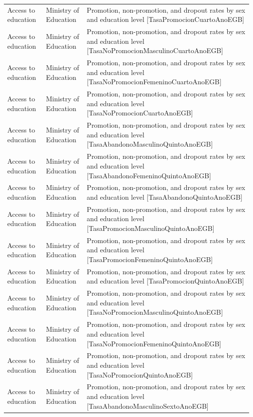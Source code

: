 \documentclass[10pt,a4paper]{article}
\begin{document}
\begin{longtable}{@{}>{\raggedright\arraybackslash}p{3.5cm}>{\raggedright\arraybackslash}p{5.6cm}>{\raggedright\arraybackslash}p{\dimexpr\textwidth-9.1cm-4\tabcolsep\relax}@{}}
Access to education & Ministry of Education & Promotion, non-promotion, and dropout rates by sex and education level [TasaPromocionCuartoAnoEGB]\\
Access to education & Ministry of Education & Promotion, non-promotion, and dropout rates by sex and education level [TasaNoPromocionMasculinoCuartoAnoEGB]\\
Access to education & Ministry of Education & Promotion, non-promotion, and dropout rates by sex and education level [TasaNoPromocionFemeninoCuartoAnoEGB]\\
Access to education & Ministry of Education & Promotion, non-promotion, and dropout rates by sex and education level [TasaNoPromocionCuartoAnoEGB]\\
Access to education & Ministry of Education & Promotion, non-promotion, and dropout rates by sex and education level [TasaAbandonoMasculinoQuintoAnoEGB]\\
Access to education & Ministry of Education & Promotion, non-promotion, and dropout rates by sex and education level [TasaAbandonoFemeninoQuintoAnoEGB]\\
Access to education & Ministry of Education & Promotion, non-promotion, and dropout rates by sex and education level [TasaAbandonoQuintoAnoEGB]\\
Access to education & Ministry of Education & Promotion, non-promotion, and dropout rates by sex and education level [TasaPromocionMasculinoQuintoAnoEGB]\\
Access to education & Ministry of Education & Promotion, non-promotion, and dropout rates by sex and education level [TasaPromocionFemeninoQuintoAnoEGB]\\
Access to education & Ministry of Education & Promotion, non-promotion, and dropout rates by sex and education level [TasaPromocionQuintoAnoEGB]\\
Access to education & Ministry of Education & Promotion, non-promotion, and dropout rates by sex and education level [TasaNoPromocionMasculinoQuintoAnoEGB]\\
Access to education & Ministry of Education & Promotion, non-promotion, and dropout rates by sex and education level [TasaNoPromocionFemeninoQuintoAnoEGB]\\
Access to education & Ministry of Education & Promotion, non-promotion, and dropout rates by sex and education level [TasaNoPromocionQuintoAnoEGB]\\
Access to education & Ministry of Education & Promotion, non-promotion, and dropout rates by sex and education level [TasaAbandonoMasculinoSextoAnoEGB]\\

\end{longtable}
\end{document}
